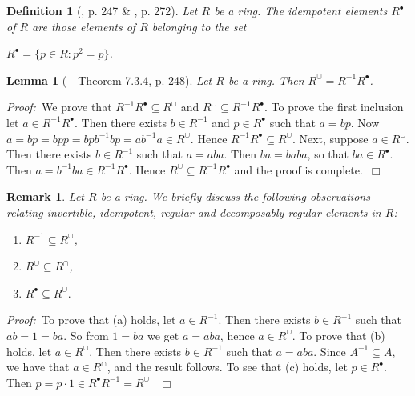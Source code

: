 \documentclass[12pt, oneside]{book}
\newtheorem{lemma}[theorem]{Lemma}
\newtheorem{definition}[theorem]{Definition}
\newtheorem{remark}[theorem]{Remark}
\newcommand{\proof}{{\noindent \it Proof:~}}
\newcommand{\qed}{\hfill ~$\Box$\\}
\begin{document}
\begin{definition}[\cite{H1}, p. 247 \& \cite{CH3}, p. 272] 
\normalfont
\noindent Let $R$ be a ring. The {\sl idempotent} elements $R^{\bullet}$ of $R$ are those elements of $R$ belonging to the set
\begin{center} 
$R^{\bullet}=\{ p \in R: p^2=p \}$.
\end{center}
\end{definition}


\pagebreak

\begin{lemma}[\cite{H1} - Theorem 7.3.4, p. 248] \label{CharRelWeyl}
\normalfont Let $R$ be a ring. Then
$R^{\cup}=R^{-1} R^{\bullet}$.

\end{lemma}

\proof \space We prove that $ R^{-1} R^{\bullet} \subseteq R^{\cup} $ and 
$R^{\cup} \subseteq R^{-1} R^{\bullet}$. To prove the first inclusion let $a \in R^{-1} R^{\bullet}$. 
Then there exists $b \in R^{-1}$ and $p \in R^{\bullet}$ such that $a=bp$. 
Now $a=bp=bpp=bpb^{-1}bp=ab^{-1}a \in R^{\cup}$. 
Hence $ R^{-1} R^{\bullet} \subseteq R^{\cup} $. Next, suppose $a \in R^{\cup}$. 
Then there exists $b \in R^{-1}$ such that $a = aba$. Then $ba = baba$, so that $ba \in R^{\bullet}$.
Then $a = b^{-1}ba \in R^{-1} R^{\bullet}$. Hence $R^{\cup} \subseteq R^{-1} R^{\bullet}$ and the 
proof is complete.\qed

\begin{remark} 
\normalfont
\noindent Let $R$ be a ring. We briefly discuss the following observations relating invertible,
idempotent, regular and decomposably regular elements in $R$:
\begin{enumerate}[label=(\alph*)]
\item $R^{-1} \subseteq R^{\cup}$,
\item $R^{\cup} \subseteq R^{\cap}$,
\item $R^{\bullet} \subseteq R^{\cup}.$
\end{enumerate}
\end{remark}

\proof \space To prove that (a) holds, let $a \in R^{-1}$. Then there exists $b \in R^{-1}$ 
such that $ab=1=ba$. So from $1 = ba$ we get $a = aba$, hence $a \in R^{\cup}$. 
\vskip 0.3cm
\noindent To prove that (b) holds, let $a \in R^{\cup}$. Then there exists $b \in R^{-1}$ such that 
$a = aba$. Since $A^{-1} \subseteq A$, we have that $a \in R^{\cap}$, and the result follows.
\vskip 0.3cm
\noindent To see that (c) holds, let $p \in R^{\bullet}$. 
Then $p=p \cdot 1 \in R^{\bullet} R^{-1}=R^{\cup}$ \qed
\end{document}
